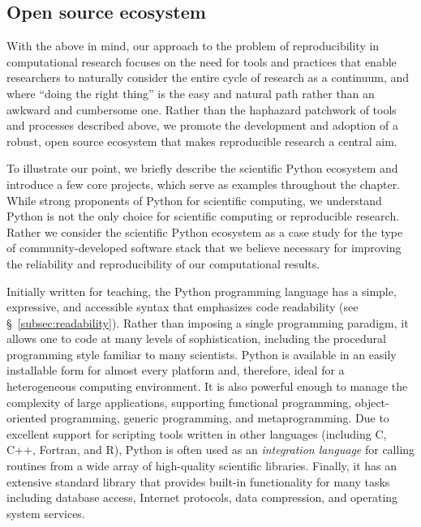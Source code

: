 \documentclass[ChapterTOCs,krantz2]{krantz} %
\begin{document}
\subsection{Open source ecosystem}

With the above in mind, our approach to the problem of reproducibility in
computational research focuses on the need for tools and practices that enable
researchers to naturally consider the entire cycle of research as a continuum,
and where ``doing the right thing'' is the easy and natural path rather than an
awkward and cumbersome one.  Rather than the haphazard patchwork of tools and
processes described above, we promote the development and adoption of a robust,
open source ecosystem that makes reproducible research a central aim.

To illustrate our point, we briefly describe the scientific Python ecosystem
\cite{oliphant2007python,millman2011python,Perez2011} and introduce a few
core projects, which serve as examples throughout the chapter.  While
strong proponents of Python for scientific computing, we understand Python is
not the only choice for scientific computing or reproducible research.  Rather
we consider the scientific Python ecosystem as a case study for the type of
community-developed software stack that we believe necessary for improving the
reliability and reproducibility of our computational results. 

Initially written for teaching, the Python programming language has a simple,
expressive, and accessible syntax that emphasizes code readability (see
§~\ref{subsec:readability}).  Rather than imposing a single programming
paradigm, it allows one to code at many levels of sophistication, including the
procedural programming style familiar to many scientists. Python is available
in an easily installable form for almost every platform and, therefore, ideal
for a heterogeneous computing environment. It is also powerful enough to manage
the complexity of large applications, supporting functional programming,
object-oriented programming, generic programming, and metaprogramming.  Due to
excellent support for scripting tools written in other languages (including C,
C++, Fortran, and R), Python is often used as an \emph{integration language} for
calling routines from a wide array of high-quality scientific libraries.
Finally, it has an extensive standard library that provides built-in
functionality for many tasks including database access, Internet protocols,
data compression, and operating system services.
\end{document}
